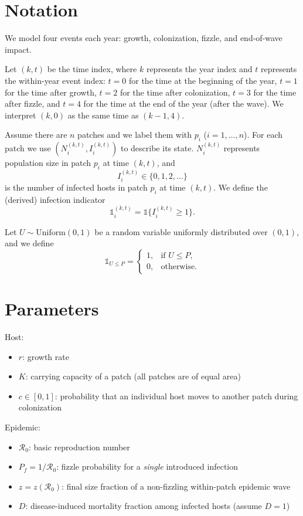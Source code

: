 \documentclass[12pt]{article}
\begin{document}
\section{Notation}
We model four events each year: growth, colonization, fizzle, and end-of-wave impact.

Let $(k,t)$ be the time index, where $k$ represents the year index and $t$ represents the within-year event index:
$t=0$ for the time at the beginning of the year,
$t=1$ for the time after growth,
$t=2$ for the time after colonization,
$t=3$ for the time after fizzle,
and $t=4$ for the time at the end of the year (after the wave).
We interpret $(k,0)$ as the same time as $(k-1,4)$.

Assume there are $n$ patches and we label them with $p_i$ ($i=1,\dots,n$).
For each patch we use $(N_i^{(k,t)}, I_i^{(k,t)})$ to describe its state.
$N_i^{(k,t)}$ represents population size in patch $p_i$ at time $(k,t)$, and
\[
I_i^{(k,t)}\in\{0,1,2,\dots\}
\]
is the number of infected hosts in patch $p_i$ at time $(k,t)$.
We define the (derived) infection indicator
\[
\mathds{1}_i^{(k,t)}=\mathds{1}\{I_i^{(k,t)}\ge 1\}.
\]

Let $U \sim \text{Uniform}(0, 1)$ be a random variable uniformly distributed over $(0,1)$, and we define
\[
\mathds{1}_{U \leq P} =
\begin{cases}
1, & \text{if } U \leq P, \\
0, & \text{otherwise.}
\end{cases}
\]

\section{Parameters}
Host:
\begin{itemize}
\item $r$: growth rate
\item $K$: carrying capacity of a patch (all patches are of equal area)
\item $c\in[0,1]$: probability that an individual host moves to another patch during colonization
\end{itemize}

Epidemic:
\begin{itemize}
\item $\mathcal{R}_0$: basic reproduction number
\item $P_f = 1/\mathcal{R}_0$: fizzle probability for a \emph{single} introduced infection
\item $z=z(\mathcal{R}_0)$: final size fraction of a non-fizzling within-patch epidemic wave
\item $D$: disease-induced mortality fraction among infected hosts (assume $D=1$)
\end{itemize}
\end{document}
